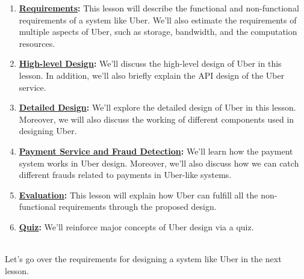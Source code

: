 \begin{enumerate}
\item
\protect{}\label{mK6g3EvpBa5OsUNBgtlP7}
\href{https://www.educative.io/courses/grokking-the-system-design-interview/requirements-of-ubers-design}{\textbf{Requirements}}\textbf{:} This lesson will describe the functional and non-functional requirements of a system like Uber. We'll also estimate the requirements of multiple aspects of Uber, such as storage, bandwidth, and the computation resources.
\item
\protect{}\label{R26znwKKzSq3iYugC3k_c}
\href{https://www.educative.io/courses/grokking-the-system-design-interview/high-level-design-of-uber}{\textbf{High-level Design}}\textbf{:} We'll discuss the high-level design of Uber in this lesson. In addition, we'll also briefly explain the API design of the Uber service.
\item
\protect{}\label{SZqjAvc6PBoVyokfkOnmZ}
\href{https://www.educative.io/courses/grokking-the-system-design-interview/detailed-design-of-uber}{\textbf{Detailed Design}}\textbf{:} We'll explore the detailed design of Uber in this lesson. Moreover, we will also discuss the working of different components used in designing Uber.
\item
\protect{}\label{98Vv5bub0ZiZOccivrnWY}
\href{https://www.educative.io/courses/grokking-the-system-design-interview/payment-service-and-fraud-detection-in-uber-design}{\textbf{Payment Service and Fraud Detection}}\textbf{:} We'll learn how the payment system works in Uber design. Moreover, we'll also discuss how we can catch different frauds related to payments in Uber-like systems.
\item
\protect{}\label{ouziJsOt3AEnZAfxGzNwl}
\href{https://www.educative.io/courses/grokking-the-system-design-interview/evaluation-of-ubers-design}{\textbf{Evaluation}}\textbf{:} This lesson will explain how Uber can fulfill all the non-functional requirements through the proposed design.
\item
\protect{}\label{3idZ0obbO2V-t-_9TdSXz}
\href{https://www.educative.io/courses/grokking-the-system-design-interview/quiz-on-ubers-design}{\textbf{Quiz}}\textbf{:} We'll reinforce major concepts of Uber design via a quiz.
\end{enumerate}
\\
Let's go over the requirements for designing a system like Uber in the next lesson.

